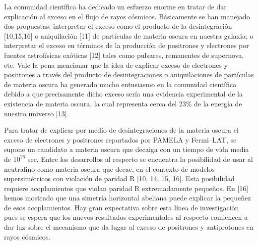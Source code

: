 \begin{ideas}
La comunidad científica ha dedicado un esfuerzo enorme en tratar de dar explicación
 al exceso en el flujo de rayos cósmicos. Básicamente se han manejado dos propuestas: 
interpretar el exceso como el producto de la desintegración [10,15,16] o aniquilación [11] de partículas 
de materia oscura en nuestra galaxia; o interpretar el exceso en términos de la producción de 
positrones y electrones por fuentes astrofísicas exóticas [12] tales como pulsares, 
remanentes de supernova, etc. Vale la pena mencionar que la idea de explicar exceso 
de electrones y positrones a través del producto de desintegraciones o aniquilaciones de 
partículas de materia oscura ha generado mucho entusiasmo en la comunidad científica debido 
a que precisamente dicho exceso sería una evidencia experimental de la existencia de 
materia oscura, la cual representa cerca del $23\%$ de la energía de nuestro universo [13]. 

Para tratar de explicar por medio de desintegraciones de la materia oscura el exceso de 
electrones y positrones reportados por PAMELA y Fermi–LAT, se supone un candidato a 
materia oscura que decaiga con un tiempo de vida media de $10^26$ sec. Entre los desarrollos 
al respecto se encuentra la posibilidad de usar al neutralino como materia oscura que decae, 
en el contexto de modelos supersimétricos con violación de paridad R [10, 14, 15, 16]. 
Esta posibilidad requiere acoplamientos que violan paridad R extremadamente pequeños. 
En [16] hemos mostrado que una simetría horizontal abeliana puede explicar la pequeñez 
de esos acoplamientos. Hay gran expectativa sobre esta línea de investigación pues se 
espera que los nuevos resultados experimentales al respecto comiencen a dar luz sobre 
el mecanismo que da lugar al exceso de positrones y antiprotones en rayos cósmicos.


\end{ideas}
